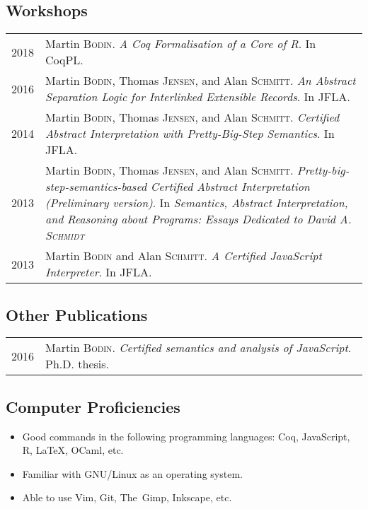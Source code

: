 \documentclass[12pt,a4paper]{article}
\makeatletter
\newenvironment{datecvsection}[1]%
               {\subsection*{#1}%
                 \noindent \begin{tabular}{@{}p{\annee}p{\texte}@{}}}
               {\end{tabular}}
\newenvironment{itemcvsection}[1]%
               {\subsection*{#1}\begin{itemize}}
               {\end{itemize}}
\makeatother
\begin{document}
\begin{datecvsection}{Workshops}

  2018 & Martin \textsc{Bodin}. \textit{A Coq Formalisation of a Core of R}. In CoqPL. \\

  2016 & Martin \textsc{Bodin}, Thomas \textsc{Jensen}, and Alan \textsc{Schmitt}. \textit{An Abstract Separation Logic for Interlinked Extensible Records}. In JFLA. \\

  2014 & Martin \textsc{Bodin}, Thomas \textsc{Jensen}, and Alan \textsc{Schmitt}. \textit{Certified Abstract Interpretation with Pretty-Big-Step Semantics}. In JFLA. \\

  2013 & Martin \textsc{Bodin}, Thomas \textsc{Jensen}, and Alan \textsc{Schmitt}. \textit{Pretty-big-step-semantics-based Certified Abstract Interpretation (Preliminary version)}. In \textit{Semantics, Abstract Interpretation, and Reasoning about Programs: Essays Dedicated to David A. \textsc{Schmidt}} \\ %

  2013 & Martin \textsc{Bodin} and Alan \textsc{Schmitt}. \textit{A Certified JavaScript Interpreter}. In JFLA. \\

\end{datecvsection}

\begin{datecvsection}{Other Publications}

    2016 & Martin \textsc{Bodin}. \textit{Certified semantics and analysis of JavaScript}. Ph.D. thesis. \\

\end{datecvsection}

\begin{itemcvsection}{Computer Proficiencies}

	\item Good commands in the following programming languages:  Coq, JavaScript, R, \LaTeX, OCaml, etc.
	\item Familiar with GNU/Linux as an operating system.
	\item Able to use Vim, Git, The~Gimp, Inkscape, etc.

\end{itemcvsection}
\end{document}
